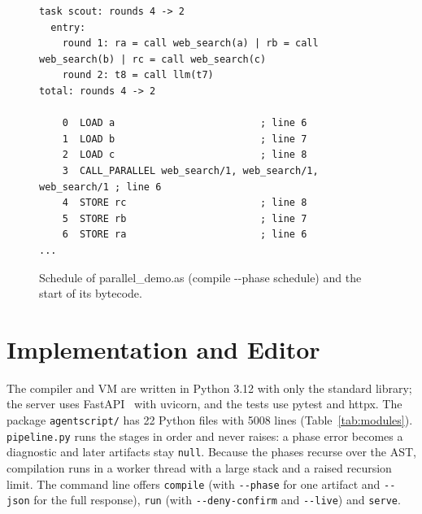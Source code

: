 \documentclass[conference]{IEEEtran}
\begin{document}
\begin{figure}[!htb]
\begin{lstlisting}
task scout: rounds 4 -> 2
  entry:
    round 1: ra = call web_search(a) | rb = call web_search(b) | rc = call web_search(c)
    round 2: t8 = call llm(t7)
total: rounds 4 -> 2

    0  LOAD a                         ; line 6
    1  LOAD b                         ; line 7
    2  LOAD c                         ; line 8
    3  CALL_PARALLEL web_search/1, web_search/1, web_search/1 ; line 6
    4  STORE rc                       ; line 8
    5  STORE rb                       ; line 7
    6  STORE ra                       ; line 6
...
\end{lstlisting}
\caption{Schedule of parallel\_demo.as (compile -{}-phase schedule) and the start of its bytecode.}
\label{fig:sched}
\end{figure}

\section{Implementation and Editor}
The compiler and VM are written in Python 3.12 with only the standard library; the server uses FastAPI~\cite{fastapi} with uvicorn, and the tests use pytest and httpx. The package \texttt{agentscript/\allowbreak{}} has 22 Python files with 5008 lines (Table~\ref{tab:modules}). \texttt{pipeline.py} runs the stages in order and never raises: a phase error becomes a diagnostic and later artifacts stay \texttt{null}. Because the phases recurse over the AST, compilation runs in a worker thread with a large stack and a raised recursion limit. The command line offers \texttt{compile} (with \texttt{-{}-{}phase} for one artifact and \texttt{-{}-{}json} for the full response), \texttt{run} (with \texttt{-{}-{}deny-{}confirm} and \texttt{-{}-{}live}) and \texttt{serve}.
\end{document}
